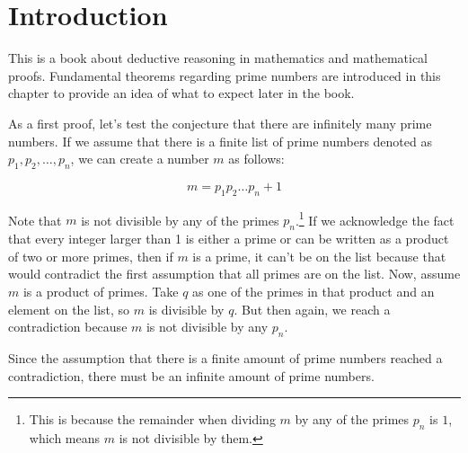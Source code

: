 \chapter{Introduction}

This is a book about deductive reasoning in mathematics and mathematical proofs. 
Fundamental theorems regarding prime numbers are introduced in this chapter to provide 
an idea of what to expect later in the book.

As a first proof, let's test the conjecture that there are infinitely many prime numbers.
If we assume that there is a finite list of prime numbers denoted as $p_1, p_2, \ldots, p_n$, 
we can create a number $m$ as follows:

\[
m = p_1p_2 \ldots p_n + 1
\]

Note that $m$ is not divisible by any of the primes $p_n$.\footnote{This is because the 
remainder when dividing $m$ by any of the primes $p_n$ is $1$, which means $m$ is not divisible by them.}
If we acknowledge the fact that every integer larger than 1 is either a prime or can be 
written as a product of two or more primes, then if $m$ is a prime, it can't be on the 
list because that would contradict the first assumption that all primes are on the list. 
Now, assume $m$ is a product of primes. Take $q$ as one of the primes in that product and 
an element on the list, so $m$ is divisible by $q$. But then again, we reach a contradiction 
because $m$ is not divisible by any $p_n$.

Since the assumption that there is a finite amount of prime numbers reached a contradiction,
there must be an infinite amount of prime numbers.


